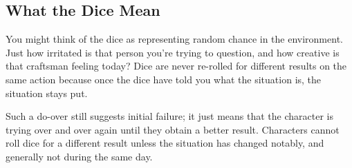 \begin{multicols}{2}
\subsection{What the Dice Mean}

You might think of the dice as representing random chance in the environment. Just how irritated is that person you're trying to question, and how creative is that craftsman feeling today? Dice are never re-rolled for different results on the same action because once the dice have told you what the situation is, the situation stays put.

Such a do-over still suggests initial failure; it just means that the character is trying over and over again until they obtain a better result.
Characters cannot roll dice for a different result unless the situation has changed notably, and generally not during the same day.

\end{multicols}

\section{}
\label{weight}

